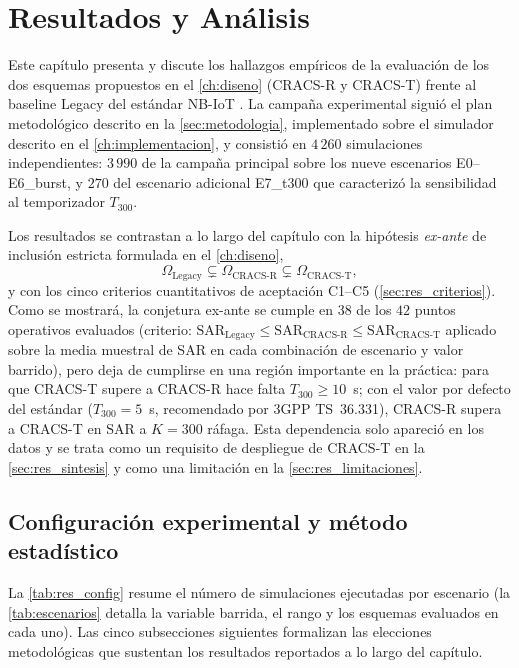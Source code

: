 \chapter{Resultados y Análisis}
\label{ch:resultados}

Este capítulo presenta y discute los hallazgos empíricos de la evaluación de los dos esquemas propuestos en el \cref{ch:diseno} (CRACS-R y CRACS-T) frente al baseline Legacy del estándar NB-IoT \cite{ref18}. La campaña experimental siguió el plan metodológico descrito en la \cref{sec:metodologia}, implementado sobre el simulador descrito en el \cref{ch:implementacion}, y consistió en $4\,260$ simulaciones independientes: $3\,990$ de la campaña principal sobre los nueve escenarios E0--E6\_burst, y $270$ del escenario adicional E7\_t300 que caracterizó la sensibilidad al temporizador $T_{300}$.

Los resultados se contrastan a lo largo del capítulo con la hipótesis \emph{ex-ante} de inclusión estricta formulada en el \cref{ch:diseno},
\[
\Omega_{\text{Legacy}} \subsetneq \Omega_{\text{CRACS-R}} \subsetneq \Omega_{\text{CRACS-T}},
\]
y con los cinco criterios cuantitativos de aceptación C1--C5 (\cref{sec:res_criterios}). Como se mostrará, la conjetura ex-ante se cumple en $38$ de los $42$ puntos operativos evaluados (criterio: $\mathrm{SAR}_{\text{Legacy}} \leq \mathrm{SAR}_{\text{CRACS-R}} \leq \mathrm{SAR}_{\text{CRACS-T}}$ aplicado sobre la media muestral de SAR en cada combinación de escenario y valor barrido), pero deja de cumplirse en una región importante en la práctica: para que CRACS-T supere a CRACS-R hace falta $T_{300} \geq 10$~s; con el valor por defecto del estándar ($T_{300}=5$~s, recomendado por 3GPP TS~36.331), CRACS-R supera a CRACS-T en $\mathrm{SAR}$ a $K{=}300$ ráfaga. Esta dependencia solo apareció en los datos y se trata como un requisito de despliegue de CRACS-T en la \cref{sec:res_sintesis} y como una limitación en la \cref{sec:res_limitaciones}.

\section{Configuración experimental y método estadístico}
\label{sec:res_config}

La \cref{tab:res_config} resume el número de simulaciones ejecutadas por escenario (la \cref{tab:escenarios} detalla la variable barrida, el rango y los esquemas evaluados en cada uno). Las cinco subsecciones siguientes formalizan las elecciones metodológicas que sustentan los resultados reportados a lo largo del capítulo.

